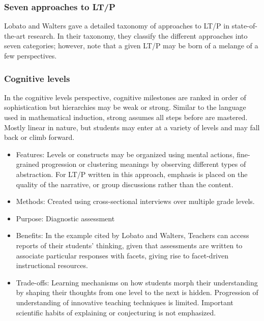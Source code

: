 \documentclass{TC}
\begin{document}
\subsubsection{Seven approaches to LT/P}
Lobato and Walters \parencite{lobato_taxonomy_2017} gave a detailed taxonomy of approaches to LT/P in state-of-the-art research. In their taxonomy, they classify the different approaches into seven categories; however, note that a given LT/P may be born of a melange of a few perspectives.

\subsubsection{Cognitive levels}

In the cognitive levels perspective, cognitive milestones are ranked in order of sophistication but hierarchies may be weak or strong. Similar to the language used in mathematical induction, strong assumes all steps before are mastered. Mostly linear in nature, but students may enter at a variety of levels and may fall back or climb forward. 
\begin{multicols}{2}
\begin{itemize}
\item Features: Levels or constructs may be organized using mental actions, fine-grained progression or clustering meanings by observing different types of abstraction. For LT/P written in this approach, emphasis is placed on the quality of the narrative, or group discussions rather than the content.

\item Methods: Created using cross-sectional interviews over multiple grade levels. 

\item Purpose: Diagnostic assessment

\item Benefits: In the example cited by Lobato and Walters, Teachers can access reports of their students' thinking, given that assessments are written to associate particular responses with facets, giving rise to facet-driven instructional resources.

\item Trade-offs: Learning mechanisms on how students morph their understanding by shaping their thoughts from one level to the next is hidden. Progression of understanding of innovative teaching techniques is limited. Important scientific habits of explaining or conjecturing is not emphasized. 
 \end{itemize}
 \end{multicols}
 
\end{document}

